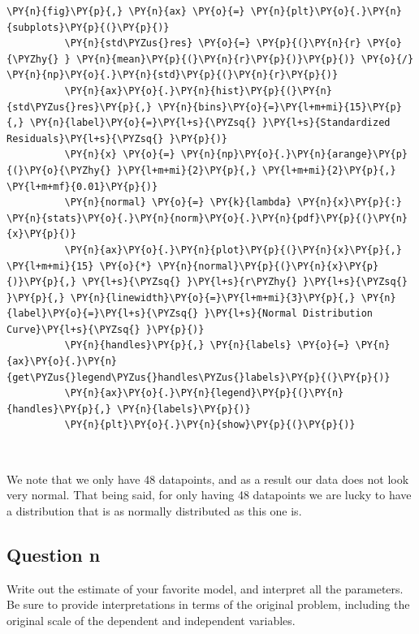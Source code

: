 \documentclass[10pt]{article}\usepackage[]{graphicx}\usepackage[]{xcolor}
\begin{document}
    \begin{Verbatim}[commandchars=\\\{\}]
 \PY{n}{fig}\PY{p}{,} \PY{n}{ax} \PY{o}{=} \PY{n}{plt}\PY{o}{.}\PY{n}{subplots}\PY{p}{(}\PY{p}{)}
          \PY{n}{std\PYZus{}res} \PY{o}{=} \PY{p}{(}\PY{n}{r} \PY{o}{\PYZhy{} } \PY{n}{mean}\PY{p}{(}\PY{n}{r}\PY{p}{)}\PY{p}{)} \PY{o}{/} \PY{n}{np}\PY{o}{.}\PY{n}{std}\PY{p}{(}\PY{n}{r}\PY{p}{)}
          \PY{n}{ax}\PY{o}{.}\PY{n}{hist}\PY{p}{(}\PY{n}{std\PYZus{}res}\PY{p}{,} \PY{n}{bins}\PY{o}{=}\PY{l+m+mi}{15}\PY{p}{,} \PY{n}{label}\PY{o}{=}\PY{l+s}{\PYZsq{} }\PY{l+s}{Standardized Residuals}\PY{l+s}{\PYZsq{} }\PY{p}{)}
          \PY{n}{x} \PY{o}{=} \PY{n}{np}\PY{o}{.}\PY{n}{arange}\PY{p}{(}\PY{o}{\PYZhy{} }\PY{l+m+mi}{2}\PY{p}{,} \PY{l+m+mi}{2}\PY{p}{,} \PY{l+m+mf}{0.01}\PY{p}{)}
          \PY{n}{normal} \PY{o}{=} \PY{k}{lambda} \PY{n}{x}\PY{p}{:} \PY{n}{stats}\PY{o}{.}\PY{n}{norm}\PY{o}{.}\PY{n}{pdf}\PY{p}{(}\PY{n}{x}\PY{p}{)}
          \PY{n}{ax}\PY{o}{.}\PY{n}{plot}\PY{p}{(}\PY{n}{x}\PY{p}{,} \PY{l+m+mi}{15} \PY{o}{*} \PY{n}{normal}\PY{p}{(}\PY{n}{x}\PY{p}{)}\PY{p}{,} \PY{l+s}{\PYZsq{} }\PY{l+s}{r\PYZhy{} }\PY{l+s}{\PYZsq{} }\PY{p}{,} \PY{n}{linewidth}\PY{o}{=}\PY{l+m+mi}{3}\PY{p}{,} \PY{n}{label}\PY{o}{=}\PY{l+s}{\PYZsq{} }\PY{l+s}{Normal Distribution Curve}\PY{l+s}{\PYZsq{} }\PY{p}{)}
          \PY{n}{handles}\PY{p}{,} \PY{n}{labels} \PY{o}{=} \PY{n}{ax}\PY{o}{.}\PY{n}{get\PYZus{}legend\PYZus{}handles\PYZus{}labels}\PY{p}{(}\PY{p}{)}
          \PY{n}{ax}\PY{o}{.}\PY{n}{legend}\PY{p}{(}\PY{n}{handles}\PY{p}{,} \PY{n}{labels}\PY{p}{)}
          \PY{n}{plt}\PY{o}{.}\PY{n}{show}\PY{p}{(}\PY{p}{)}
\end{Verbatim}

    \begin{center}
    \end{center}
    { \hspace*{\fill} \\}
    
    We note that we only have 48 datapoints, and as a result our data does
not look very normal. That being said, for only having 48 datapoints we
are lucky to have a distribution that is as normally distributed as this
one is.



\subsection*{Question n}
    Write out the estimate of your favorite model, and interpret all the parameters. Be sure to provide
    interpretations in terms of the original problem, including the original scale of the dependent and independent
    variables.\newline
\end{document}
